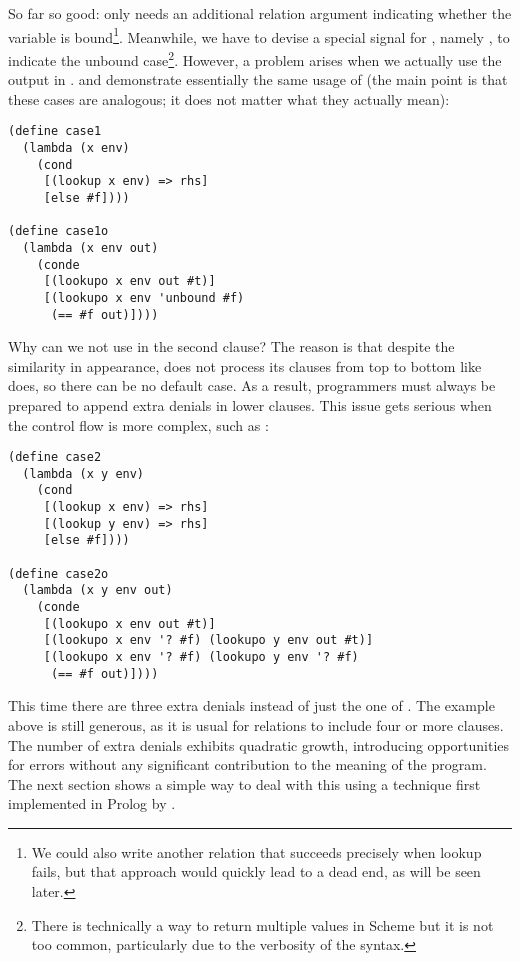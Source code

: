 So far so good:  only needs an additional relation argument indicating whether the variable is bound\footnote{We could also write another relation that succeeds precisely when lookup fails, but that approach would quickly lead to a dead end, as will be seen later.}. Meanwhile, we have to devise a special signal for , namely , to indicate the unbound case\footnote{There is technically a way to return multiple values in Scheme but it is not too common, particularly due to the verbosity of the syntax.}. However, a problem arises when we actually use the output in .  and  demonstrate essentially the same usage of  (the main point is that these cases are analogous; it does not matter what they actually mean):
\begin{lstlisting}
(define case1
  (lambda (x env)
    (cond
     [(lookup x env) => rhs]
     [else #f])))

(define case1o
  (lambda (x env out)
    (conde
     [(lookupo x env out #t)]
     [(lookupo x env 'unbound #f)
      (== #f out)])))
\end{lstlisting}

Why can we not use  in the second clause? The reason is that despite the similarity in appearance,  does not process its clauses from top to bottom like  does, so there can be no default case. As a result, programmers must always be prepared to append extra denials in lower  clauses. This issue gets serious when the control flow is more complex, such as :

\begin{lstlisting}
(define case2
  (lambda (x y env)
    (cond
     [(lookup x env) => rhs]
     [(lookup y env) => rhs]
     [else #f])))

(define case2o
  (lambda (x y env out)
    (conde
     [(lookupo x env out #t)]
     [(lookupo x env '? #f) (lookupo y env out #t)]
     [(lookupo x env '? #f) (lookupo y env '? #f)
      (== #f out)])))
\end{lstlisting}

This time there are three extra denials instead of just the one of . The example above is still generous, as it is usual for relations to include four or more  clauses. The number of extra denials exhibits quadratic growth, introducing opportunities for errors without any significant contribution to the meaning of the program. The next section shows a simple way to deal with this using a technique first implemented in Prolog by \textcite{reif}.

